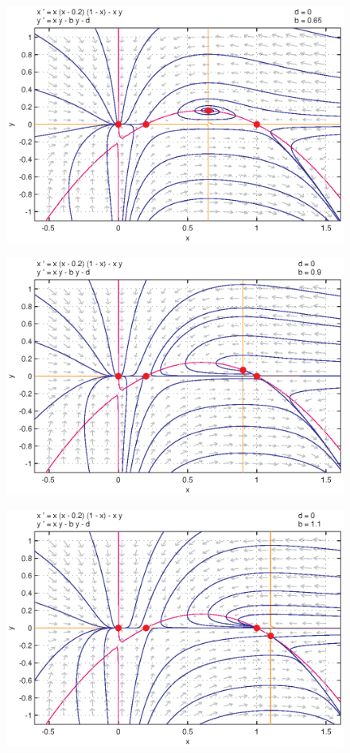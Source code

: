 \documentclass[a4paper, 11pt]{article}
\begin{document}
\begin{figure}[htp]
\centering
\includegraphics{img/ex3/PPLANE3.eps}
\caption{}
\label{fig:PPLANE3}
\end{figure}
\begin{figure}[htp]
\centering
\includegraphics{img/ex3/PPLANE4.eps}
\caption{}
\label{fig:}
\end{figure}
\begin{figure}[htp]
\centering
\includegraphics{img/ex3/PPLANE5.eps}
\caption{}
\label{fig:PPLANE5}
\end{figure}
\clearpage
\end{document}
